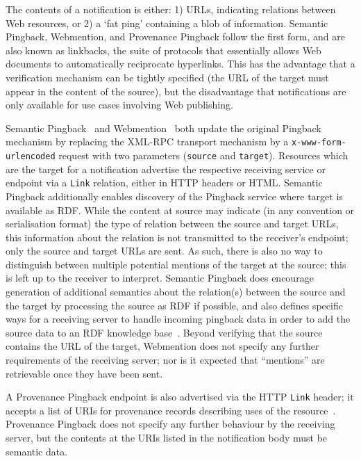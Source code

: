 \documentclass[a4paper]{llncs}
\begin{document}
\par The contents of a notification is either: 1) URLs, indicating relations between Web resources, or 2) a ‘fat ping’ containing a blob of information. Semantic Pingback, Webmention, and Provenance Pingback follow the first form, and are also known as linkbacks, the suite of protocols that essentially allows Web documents to automatically reciprocate hyperlinks. This has the advantage that a verification mechanism can be tightly specified (the URL of the target must appear in the content of the source), but the disadvantage that notifications are only available for use cases involving Web publishing.


\par \empty Semantic Pingback~\cite{ref-2} and \empty Webmention~\cite{ref-5} both update the original \empty Pingback~\cite{ref-6} mechanism by replacing the XML-RPC transport mechanism by a {\tt x-www-form-urlencoded} request with two parameters ({\tt source} and {\tt target}). Resources which are the target for a notification advertise the respective receiving service or endpoint via a {\tt Link} relation, either in HTTP headers or HTML. Semantic Pingback additionally enables discovery of the Pingback service where target is available as RDF. While the content at source may indicate (in any convention or serialisation format) the type of relation between the source and target URLs, this information about the relation is not transmitted to the receiver’s endpoint; only the source and target URLs are sent. As such, there is also no way to distinguish between multiple potential mentions of the target at the source; this is left up to the receiver to interpret. Semantic Pingback does encourage generation of additional semantics about the relation(s) between the source and the target by processing the source as RDF if possible, and also defines specific ways for a receiving server to handle incoming pingback data in order to add the source data to an RDF knowledge base~\cite{ref-2}. Beyond verifying that the source contains the URL of the target, Webmention does not specify any further requirements of the receiving server; nor is it expected that “mentions” are retrievable once they have been sent.


\par A \empty Provenance Pingback endpoint is also advertised via the HTTP {\tt Link} header; it accepts a list of URIs for provenance records describing uses of the resource~\cite{ref-7}. Provenance Pingback does not specify any further behaviour by the receiving server, but the contents at the URIs listed in the notification body must be semantic data.
\end{document}
